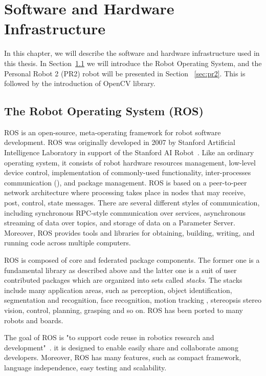 \chapter{Software and Hardware Infrastructure}
\label{chapter:SHI}
In this chapter, we will describe the software and hardware
infrastructure used in this thesis. In Section~\ref{sec:ros} we will introduce the
Robot Operating System, and the Personal Robot 2 (PR2) robot will be presented in Section
~\ref{sec:pr2}. This is followed by the introduction of OpenCV library.

\section{The Robot Operating System (ROS)}
\label{sec:ros}
ROS is an open-source, meta-operating framework for robot software
development. ROS was originally developed in 2007 by Stanford Artificial Intelligence Laboratory in support of the Stanford AI Robot~\cite{quigley2007stair}. Like an ordinary operating system, it consists of  robot
hardware resources management, low-level device control, implementation
of commonly-used functionality, inter-processes communication (), and package
management. ROS is based on a peer-to-peer network architecture where
processing takes place in nodes that may receive, post, control, state
messages. There are several different styles of communication, including synchronous RPC-style communication over services, asynchronous
streaming of data over topics, and storage of data on a Parameter
Server.
Moreover, ROS provides tools and libraries for obtaining, building, writing, and
running code across multiple computers.

ROS is composed of core and federated package components. The former one is a fundamental library as described
above and the latter one is a suit of user contributed packages which
are organized into sets called \textit{stacks}. The stacks include
many application areas, such as  perception, object identification,
segmentation and recognition, face recognition, motion tracking ,
stereopsis stereo vision, control, planning, grasping and so on. ROS has been ported to many robots and boards.

The goal of ROS is "to support code reuse in robotics research and
development"~\cite{rosintroduction}.  it is designed to enable easily
share and collaborate among developers. Moreover, ROS has many
features, such as compact framework, language independence, easy
testing and scalability.

